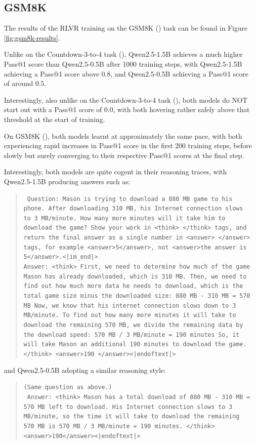 \documentclass{article} %
\theoremstyle{definition}
\begin{document}
\subsection{GSM8K}
The results of the RLVR training on the GSM8K (\cite{gsm8k}) task can be found in Figure \ref{fig:gsm8k-results}.

Unlike on the Countdown-3-to-4 task (\cite{countdown}), Qwen2.5-1.5B achieves a much higher Pass@1 score
than Qwen2.5-0.5B after 1000 training steps, with Qwen2.5-1.5B achieving a Pass@1 score above 0.8,
and Qwen2.5-0.5B achieving a Pass@1 score of around 0.5.

Interestingly, also unlike on the Countdown-3-to-4 task (\cite{countdown}), 
both models do NOT start out with a Pass@1 score of 0.0, with both hovering rather safely
above that threshold at the start of training.

On GSM8K (\cite{gsm8k}), both models learnt at approximately the same pace, with both experiencing
rapid increases in Pass@1 score in the first 200 training steps,
before slowly but surely converging to their respective Pass@1 scores at the final step.

Interestingly, both models are quite cogent in their reasoning traces,
with Qwen2.5-1.5B producing answers such as:
\begin{quote}
    \texttt{
        Question: Mason is trying to download a 880 MB game to his phone. After downloading 310 MB, his Internet connection slows to 3 MB/minute. How many more minutes will it take him to download the game? Show your work in <think> </think> tags, and return the final answer as a single number in <answer> </answer> tags, for example <answer>5</answer>, not <answer>the answer is 5</answer>.<|im\_end|>
    } \\
    \texttt{Answer: <think>
        First, we need to determine how much of the game Mason has already downloaded, which is 310 MB.
        Then, we need to find out how much more data he needs to download, which is the total game size minus the downloaded size: 880 MB - 310 MB = 570 MB
        Now, we know that his internet connection slows down to 3 MB/minute. To find out how many more minutes it will take to download the remaining 570 MB, we divide the remaining data by the download speed: 570 MB / 3 MB/minute = 190 minutes
        So, it will take Mason an additional 190 minutes to download the game.
        </think>
        <answer>190 </answer><|endoftext|>
    }
\end{quote}

and Qwen2.5-0.5B adopting a similar reasoning style:
\begin{quote}
    \texttt{(Same question as above.)} \\
    \texttt{
        Answer: <think>
         Mason has a total download of 880 MB - 310 MB = 570 MB left to download. His Internet connection slows to 3 MB/minute, so the time it will take to download the remaining 570 MB is 570 MB / 3 MB/minute = 190 minutes. </think>
<answer>190</answer><|endoftext|>
    }
\end{quote}
\end{document}

